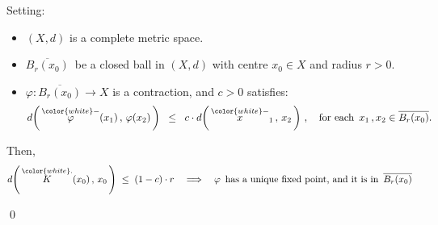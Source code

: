 \begin{corollary}
\mbox{}\vskip 0.1cm
\noindent
Setting:
\begin{itemize}
\item
	$(X,d)$ is a complete metric space.
\item
	$\overline{B_{r}(x_{0})}$\, be a closed ball in $(X,d)$ with centre $x_{0} \in X$ and radius $r > 0$.
\item
	$\varphi : \overline{B_{r}(x_{0})} \longrightarrow X$ is a contraction, and $c > 0$ satisfies:
	\begin{equation*}
	d\!\left(\,\overset{{\color{white}-}}{\varphi}(x_{1}) \,,\, \varphi(x_{2})\,\right)
	\;\; \leq \;\;
		c \cdot d\!\left(\,\overset{{\color{white}-}}{x}_{1} \,,\, x_{2}\,\right)\,,
		\quad
		\textnormal{for each \,$x_{1}\,, x_{2} \in \overline{B_{r}(x_{0})}$}.
	\end{equation*}
\end{itemize}
Then,
\begin{equation*}
d\!\left(\, \overset{{\color{white}.}}{K}(x_{0}) \,,\, x_{0} \,\right) \; \leq \; (1-c) \cdot r
\quad\Longrightarrow\quad
\textnormal{$\varphi$\, has a unique fixed point, and it is in \,$\overline{B_{r}(x_{0})}$}
\end{equation*}
\end{corollary}
\proof

\qed


\vskip 0.5cm

